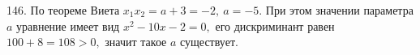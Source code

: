 146. По теореме Виета $x_1x_2=a+3=-2,\ a=-5.$ При этом значении параметра $a$ уравнение имеет вид $x^2-10x-2=0,$ его дискриминант равен $100+8=108>0,$ значит такое $a$ существует.\\
